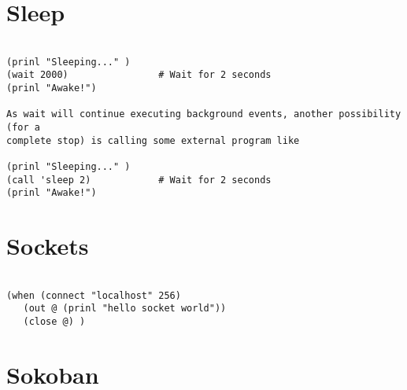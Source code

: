 \section*{Sleep}

\begin{verbatim}

(prinl "Sleeping..." )
(wait 2000)                # Wait for 2 seconds
(prinl "Awake!")

As wait will continue executing background events, another possibility (for a
complete stop) is calling some external program like

(prinl "Sleeping..." )
(call 'sleep 2)            # Wait for 2 seconds
(prinl "Awake!")

\end{verbatim}

\section*{Sockets}

\begin{verbatim}

(when (connect "localhost" 256)
   (out @ (prinl "hello socket world"))
   (close @) )

\end{verbatim}

\section*{Sokoban}

